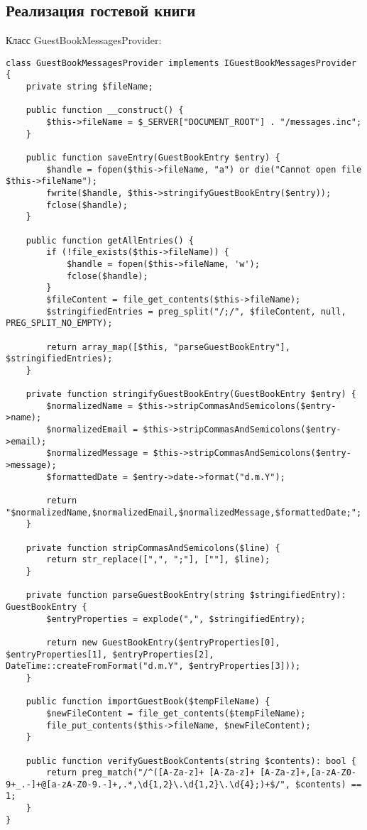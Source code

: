 \documentclass[a4paper,14pt]{extarticle}
\begin{document}
\subsection{Реализация гостевой книги}
Класс GuestBookMessagesProvider:
\begin{lstlisting}
class GuestBookMessagesProvider implements IGuestBookMessagesProvider {
    private string $fileName;

    public function __construct() {
        $this->fileName = $_SERVER["DOCUMENT_ROOT"] . "/messages.inc";
    }

    public function saveEntry(GuestBookEntry $entry) {
        $handle = fopen($this->fileName, "a") or die("Cannot open file $this->fileName");
        fwrite($handle, $this->stringifyGuestBookEntry($entry));
        fclose($handle);
    }

    public function getAllEntries() {
        if (!file_exists($this->fileName)) {
            $handle = fopen($this->fileName, 'w');
            fclose($handle);
        }
        $fileContent = file_get_contents($this->fileName);
        $stringifiedEntries = preg_split("/;/", $fileContent, null, PREG_SPLIT_NO_EMPTY);

        return array_map([$this, "parseGuestBookEntry"], $stringifiedEntries);
    }

    private function stringifyGuestBookEntry(GuestBookEntry $entry) {
        $normalizedName = $this->stripCommasAndSemicolons($entry->name);
        $normalizedEmail = $this->stripCommasAndSemicolons($entry->email);
        $normalizedMessage = $this->stripCommasAndSemicolons($entry->message);
        $formattedDate = $entry->date->format("d.m.Y");

        return "$normalizedName,$normalizedEmail,$normalizedMessage,$formattedDate;";
    }

    private function stripCommasAndSemicolons($line) {
        return str_replace([",", ";"], [""], $line);
    }

    private function parseGuestBookEntry(string $stringifiedEntry): GuestBookEntry {
        $entryProperties = explode(",", $stringifiedEntry);

        return new GuestBookEntry($entryProperties[0], $entryProperties[1], $entryProperties[2], DateTime::createFromFormat("d.m.Y", $entryProperties[3]));
    }

    public function importGuestBook($tempFileName) {
        $newFileContent = file_get_contents($tempFileName);
        file_put_contents($this->fileName, $newFileContent);
    }

    public function verifyGuestBookContents(string $contents): bool {
        return preg_match("/^([A-Za-z]+ [A-Za-z]+ [A-Za-z]+,[a-zA-Z0-9+_.-]+@[a-zA-Z0-9.-]+,.*,\d{1,2}\.\d{1,2}\.\d{4};)+$/", $contents) == 1;
    }
}
\end{lstlisting}
\end{document}
